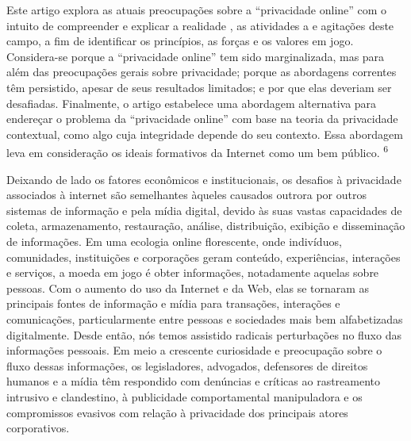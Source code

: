 Este artigo explora as atuais preocupações sobre a ``privacidade
online'' com o intuito de compreender e explicar a realidade , as
atividades a e agitações deste campo, a fim de identificar os
princípios, as forças e os valores em jogo. Considera-se porque a
``privacidade online'' tem sido marginalizada, mas para além das
preocupações gerais sobre privacidade; porque as abordagens correntes
têm persistido, apesar de seus resultados limitados; e por que elas
deveriam ser desafiadas. Finalmente, o artigo estabelece uma abordagem
alternativa para endereçar o problema da ``privacidade online'' com base
na teoria da privacidade contextual, como algo cuja integridade depende
do seu contexto. Essa abordagem leva em consideração os ideais
formativos da Internet como um bem público. \textsuperscript{{6}}

Deixando de lado os fatores econômicos e institucionais, os desafios à
privacidade associados à internet são semelhantes àqueles causados
outrora por outros sistemas de informação e pela mídia digital, devido
às suas vastas capacidades de coleta, armazenamento, restauração,
análise, distribuição, exibição e disseminação de informações. Em uma
ecologia online florescente, onde indivíduos, comunidades, instituições
e corporações geram conteúdo, experiências, interações e serviços, a
moeda em jogo é obter informações, notadamente aquelas sobre pessoas.
Com o aumento do uso da Internet e da Web, elas se tornaram as
principais fontes de informação e mídia para transações, interações e
comunicações, particularmente entre pessoas e sociedades mais bem
alfabetizadas digitalmente. Desde então, nós temos assistido radicais
perturbações no fluxo das informações pessoais. Em meio a crescente
curiosidade e preocupação sobre o fluxo dessas informações, os
legisladores, advogados, defensores de direitos humanos e a mídia têm
respondido com denúncias e críticas ao rastreamento intrusivo e
clandestino, à publicidade comportamental manipuladora e os compromissos
evasivos com relação à privacidade dos principais atores corporativos.

